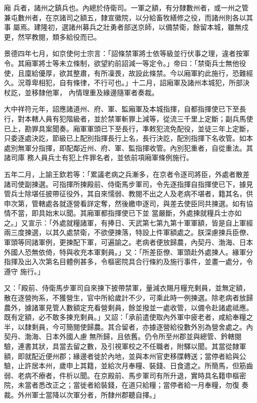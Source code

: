 
\begin{pinyinscope}

 廂
 兵者，諸州之鎮兵也。內總於侍衛司。一軍之額，有分隸數州者，或一州之管兼屯數州者，在京諸司之額五，隸宣徽院，以分給畜牧繕修之役，而諸州則各以其事
 屬焉。建隆初，選諸州募兵之壯勇者部送京師，以備禁衛，餘留本城，雖無戍更，然罕教閱，類多給役而已。



 景德四年七月，如京使何士宗言：「詔條禁軍將士依等級並行伏事之理，違者按軍令。其廂軍將士等未立條制，欲望約前詔減一等定令。」帝曰：「禁衛兵士無他役使，且廩給優厚，欲其整肅，有所凜畏，故設此條禁。今以廂軍約此施行，恐難經久。況尊卑相犯，自有條律，不行可也。」十二月，詔廂軍及諸州本城犯，所部決杖訖，並移隸他軍，
 內情理重及緣邊隨軍者奏裁。



 大中祥符元年，詔應諸道州、府、軍、監廂軍及本城指揮，自都指揮使已下至長行，對本轄人員有犯階級者，並於禁軍斬罪上減等，從流三千里上定斷；副兵馬使已上，勘罪具案聞奏。廂軍軍頭已下至長行，準敕犯流免配役，並徒三年上定斷，只委逐處決訖，節級已上配別指揮長行上名，長行決訖，配別指揮下名收管。如本處別無軍分指揮，即配鄰近州、府、軍、監指揮收管。內別犯重者，自從重法。其諸司庫
 務人員兵士有犯上件罪名者，並依前項廂軍條例施行。



 五年二月，上諭王欽若等：「累議老病之兵漸多，在京者令逐司將臣，外處者散差諸司使副揀選。可指揮所揀殿前、侍衛馬步軍司，令先逐指揮自指揮使已下，據見管兵士除堪任披帶征役外，其自來懦弱、教閱不出之人及老病不堪者，籍其名，供申次第，管轄處各就逐營看詳定奪，然後繳申逐司，與差去使臣同共揀選。如有協情不當，即具始末以聞。其廂軍都指揮使已下並
 當嚴斷，外處揀就糧兵士亦如之。」又宣示：「外處就糧諸軍，有捧日、天武第七第九第十軍軍額，皆是自上軍經兩三度揀選，以其久處禁衛，不欲便揀落，特設上件軍額處之。朕深慮揀兵臣僚、軍頭等同諸軍例，更揀配下軍，可遍諭之。老病者便放歸農，內契丹、渤海、日本外國人恐無依倚，特與收充本軍剩員。」又：「所差臣僚、軍頭赴外處揀人。緣軍分指揮及出入次第名目體例甚多，令樞密院具合行條約及施行事件，並畫一處分，令遵守
 施行。」



 又：「殿前、侍衛馬步軍司自來揀下披帶禁軍，量減衣賜月糧充剩員，並無定額，散在逐營拘系，不獲營生，官中所給歲計不少，可乘此時一例揀選。除老病者放歸農外，據諸軍見管人數額定充看營剩員，餘並撥並一處收管，以備令赴諸處祗應。既有定額，必不敢多揀充剩員。」又詔：「承前遣使取內外軍中疲老者，咸給奉糧之半，以隸剩員，今可簡閱使歸農。其合留者，亦據逐營給役數外別為營舍處之。內契丹、渤海、日本外國人慮
 無所歸，且依舊。仍令所至州郡並與總管、鈐轄閱驗，連書其狀，具當去留之數，及引視軍校之不任職者，附驛以聞。其當從隸軍額，即就配近便州郡；緣邊者徙於內地，並與本州官吏移牒轉送；當停者給與公驗，止許居本州，歲申上其籍，並給次月奉糧、裝錢、日食遣之。所簡馬，但筋齒弱、老病不療者，件析以聞。在京殿前、馬步軍司有所升退，實時具名籍申樞密院，未當者悉改正之；當徙者給裝錢，在道只給糧；當停者給一月奉糧，勿復
 奏裁。外州軍士當降以次軍分者，所隸州郡聽自擇。」




\end{pinyinscope}
